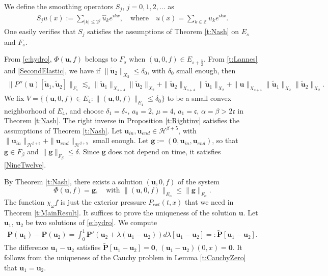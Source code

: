 \documentclass[12pt]{amsart}
\theoremstyle{remark}
\theoremstyle{definition}
\numberwithin{equation}{section}
\newcommand{\al}{\alpha}
\newcommand{\f}{\frac}
\newcommand{\la}{\lambda}
\newcommand{\bu}{\mathbf{u}}
\newcommand{\mH}{\mathcal{H}}
\begin{document}
We define the smoothing operators $S_j$, $j=0,1,2,...$ as
\begin{align*}
S_ju(x):=\sum_{|k|\leq 2^j}\hat{u}_ke^{ikx},\quad \text{where} \quad u(x)=\sum_{k\in\mathbb{Z}}\hat{u}_ke^{ikx}.
\end{align*}
One easily
verifies that $S_j$ satisfies the assumptions of Theorem \ref{t:Nash} on $E_s$ and $F_s$.

From \eqref{e:hydro}, $\Phi(\mathbf{u},f)$  belongs to $F_s$ when $(\mathbf{u},0,f)\in E_{s+\f52}$. 
From \eqref{t:Lannes} and \eqref{SecondElastic}, we have if $\|\tilde{\mathbf{u}}_2\|_{X_2}\leq\delta_0$, with $\delta_0$ small enough, then
\begin{align*}
\|P''(\mathbf{u})[\tilde{\mathbf{u}}_1, \tilde{\mathbf{u}}_2]\|_{F_s}\lesssim_s\|\tilde{\mathbf{u}}_1\|_{X_{s+4}}\|\tilde{\mathbf{u}}_2\|_{X_{2}}+\|\tilde{\mathbf{u}}_2\|_{X_{s+4}}\|\tilde{\mathbf{u}}_1\|_{X_{2}}+\|\mathbf{u}\|_{X_{s+4}}\|\tilde{\mathbf{u}}_1\|_{X_2}\|\tilde{\mathbf{u}}_2\|_{X_2}.
\end{align*}
We fix $V = \{(\mathbf{u},0, f)\in E_4: \|(\mathbf{u}, 0,f)\|_{E_4}\leq\delta_0\} $ to be a small convex neighborhood of $E_4$, and choose $\delta_1=\delta_*$,
$a_0=2$, $\mu=4$, $a_1=\mathfrak{c}$, $\al=\beta>2\mathfrak{c}$ in Theorem \ref{t:Nash}.  
The right inverse in Proposition \ref{t:Rightinv} satisfies the assumptions of Theorem \ref{t:Nash}. Let $\mathbf{u}_{in}, \mathbf{u}_{end}\in \mH^{\beta+5}$, with $\|\mathbf{u}_{in}\|_{\mH^{\beta+5}}+ \| \mathbf{u}_{end}\|_{\mH^{\beta+5}}$ small enough. 
Let $\mathbf{g} := (\textbf{0}, \mathbf{u}_{in}, \mathbf{u}_{end})$, so that $\mathbf{g}\in F_{\beta}$ and $\|\mathbf{g}\|_{F_{\beta}}\leq\delta$. Since $\mathbf{g}$ does not depend on time, it satisfies \eqref{NineTwelve}.

By Theorem \ref{t:Nash}, there exists a solution $(\mathbf{u},0,f)$ of the system 
\begin{equation*}
\Phi(\mathbf{u},f) = \mathbf{g}, \quad \text{with } \|(\mathbf{u},0,f)\|_{E_{\al}}\leq \|\mathbf{g}\|_{F_{\al}}.
\end{equation*}
The function $\chi_\omega f$ is just the exterior pressure $P_{ext}(t,x)$ that we need in Theorem \ref{t:MainResult}.
It suffices to prove the uniqueness of the solution $\bu$.
Let $\bu_1$, $\bu_2$ be two solutions of \eqref{e:hydro}. We compute
\begin{align*}
\mathbf{P}(\bu_1)-\mathbf{P}(\bu_2)=\int_0^1\mathbf{P}'(\bu_2+\la(\bu_1-\bu_2))d\la[\bu_1-\bu_2]=:\tilde{\mathbf{P}}[\bu_1-\bu_2].
\end{align*}
The difference $\bu_1-\bu_2$ satisfies $\tilde{\mathbf{P}}[\bu_1-\bu_2]= \mathbf{0}$, $(\bu_1-\bu_2)(0,x)= \mathbf{0}$. 
It follows from the uniqueness of the Cauchy problem in Lemma \ref{t:CauchyZero} that $\bu_1=\bu_2$. 
\end{document}
